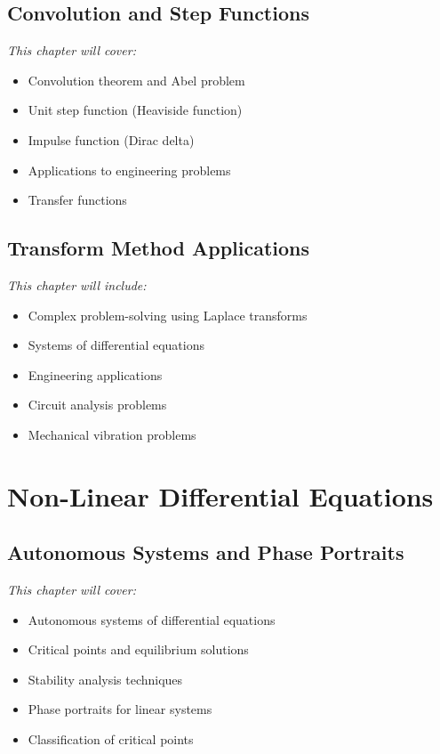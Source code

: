 \documentclass[12pt, letterpaper]{book}
\begin{document}
\chapter{Convolution and Step Functions}
\label{chap:session_12}

\textit{This chapter will cover:}
\begin{itemize}
    \item Convolution theorem and Abel problem
    \item Unit step function (Heaviside function)
    \item Impulse function (Dirac delta)
    \item Applications to engineering problems
    \item Transfer functions
\end{itemize}

\chapter{Transform Method Applications}
\label{chap:session_13}

\textit{This chapter will include:}
\begin{itemize}
    \item Complex problem-solving using Laplace transforms
    \item Systems of differential equations
    \item Engineering applications
    \item Circuit analysis problems
    \item Mechanical vibration problems
\end{itemize}

\part{Non-Linear Differential Equations}
\label{part:nonlinear_de}

\chapter{Autonomous Systems and Phase Portraits}
\label{chap:session_14}

\textit{This chapter will cover:}
\begin{itemize}
    \item Autonomous systems of differential equations
    \item Critical points and equilibrium solutions
    \item Stability analysis techniques
    \item Phase portraits for linear systems
    \item Classification of critical points
\end{itemize}
\end{document}

